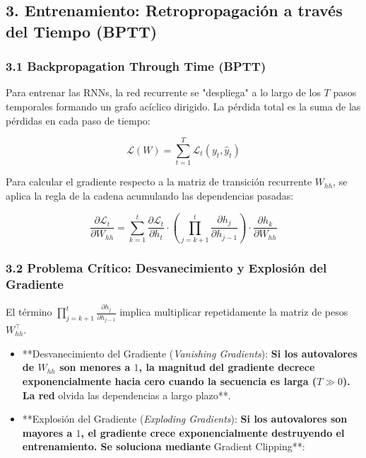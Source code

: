 \documentclass[11pt,oneside]{article}
\begin{document}
\subsection{3. Entrenamiento: Retropropagación a través del Tiempo (BPTT)}

\subsubsection{3.1 Backpropagation Through Time (BPTT)}

Para entrenar las RNNs, la red recurrente se "despliega" a lo largo de los \(T\) pasos temporales formando un grafo acíclico dirigido. La pérdida total es la suma de las pérdidas en cada paso de tiempo:

\[\mathcal{L}(W) = \sum_{t=1}^{T} \mathcal{L}_t(y_t, \hat{y}_t)\]

Para calcular el gradiente respecto a la matriz de transición recurrente \(W_{hh}\), se aplica la regla de la cadena acumulando las dependencias pasadas:

\[\frac{\partial \mathcal{L}_t}{\partial W_{hh}} = \sum_{k=1}^{t} \frac{\partial \mathcal{L}_t}{\partial h_t} \cdot \left( \prod_{j=k+1}^{t} \frac{\partial h_j}{\partial h_{j-1}} \right) \cdot \frac{\partial h_k}{\partial W_{hh}}\]

\subsubsection{3.2 Problema Crítico: Desvanecimiento y Explosión del Gradiente}

El término \(\prod_{j=k+1}^{t} \frac{\partial h_j}{\partial h_{j-1}}\) implica multiplicar repetidamente la matriz de pesos \(W_{hh}^\top\).

\begin{itemize}

\item **Desvanecimiento del Gradiente (\emph{Vanishing Gradients}):\textbf{ Si los autovalores de \(W_{hh}\) son menores a \(1\), la magnitud del gradiente decrece exponencialmente hacia cero cuando la secuencia es larga (\(T \gg 0\)). La red }olvida las dependencias a largo plazo**.

\end{itemize}

\begin{itemize}

\item **Explosión del Gradiente (\emph{Exploding Gradients}):\textbf{ Si los autovalores son mayores a \(1\), el gradiente crece exponencialmente destruyendo el entrenamiento. Se soluciona mediante }Gradient Clipping**:

\end{itemize}
\end{document}
